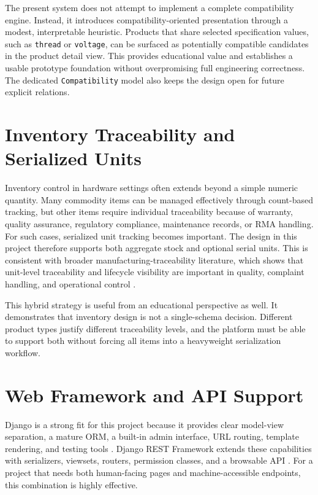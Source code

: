 \documentclass[12pt,letterpaper,oneside,openany]{book}
\begin{document}
\begin{justifying}
The present system does not attempt to implement a complete compatibility
engine. Instead, it introduces compatibility-oriented presentation through a modest,
interpretable heuristic. Products that share selected specification values, such
as \texttt{thread} or \texttt{voltage}, can be surfaced as potentially
compatible candidates in the product detail view. This provides educational
value and establishes a usable prototype foundation without overpromising full
engineering correctness. The dedicated \texttt{Compatibility} model also keeps
the design open for future explicit relations.
\end{justifying}

\section{Inventory Traceability and Serialized Units}

\begin{justifying}
Inventory control in hardware settings often extends beyond a simple numeric
quantity. Many commodity items can be managed effectively through count-based
tracking, but other items require individual traceability because of warranty,
quality assurance, regulatory compliance, maintenance records, or RMA handling.
For such cases, serialized unit tracking becomes important. The design in this
project therefore supports both aggregate stock and optional serial units. This
is consistent with broader manufacturing-traceability literature, which shows
that unit-level traceability and lifecycle visibility are important in quality,
complaint handling, and operational control \cite{traceability-review}.
\end{justifying}

\begin{justifying}
This hybrid strategy is useful from an educational perspective as well. It
demonstrates that inventory design is not a single-schema decision. Different
product types justify different traceability levels, and the platform must be
able to support both without forcing all items into a heavyweight serialization
workflow.
\end{justifying}

\section{Web Framework and API Support}

\begin{justifying}
Django is a strong fit for this project because it provides clear model-view
separation, a mature ORM, a built-in admin interface, URL routing, template
rendering, and testing tools \cite{django-docs}. Django REST Framework extends
these capabilities with serializers, viewsets, routers, permission classes, and
a browsable API \cite{drf-docs}. For a project that needs both human-facing
pages and machine-accessible endpoints, this combination is highly effective.
\end{justifying}
\end{document}
